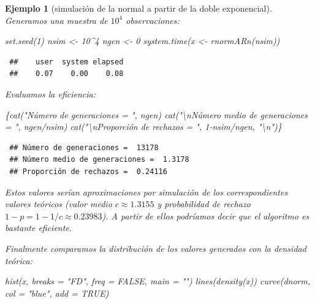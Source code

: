 \documentclass[
  10pt,
]{book}
\newenvironment{Shaded}{\begin{snugshade}}{\end{snugshade}}
\newcommand{\AttributeTok}[1]{\textcolor[rgb]{0.77,0.63,0.00}{#1}}
\newcommand{\ConstantTok}[1]{\textcolor[rgb]{0.00,0.00,0.00}{#1}}
\newcommand{\DecValTok}[1]{\textcolor[rgb]{0.00,0.00,0.81}{#1}}
\newcommand{\FunctionTok}[1]{\textcolor[rgb]{0.00,0.00,0.00}{#1}}
\newcommand{\NormalTok}[1]{#1}
\newcommand{\OtherTok}[1]{\textcolor[rgb]{0.56,0.35,0.01}{#1}}
\newcommand{\SpecialCharTok}[1]{\textcolor[rgb]{0.00,0.00,0.00}{#1}}
\newcommand{\StringTok}[1]{\textcolor[rgb]{0.31,0.60,0.02}{#1}}
\theoremstyle{break}
\newtheorem{example}{Ejemplo}[chapter]
\theoremstyle{nonumberplain}
\begin{document}
\begin{example}[simulación de la normal a partir de la doble exponencial]
Generamos una muestra de \(10^4\) observaciones:

\begin{Shaded}
\begin{Highlighting}[]
\FunctionTok{set.seed}\NormalTok{(}\DecValTok{1}\NormalTok{)}
\NormalTok{nsim }\OtherTok{\textless{}{-}} \DecValTok{10}\SpecialCharTok{\^{}}\DecValTok{4}
\NormalTok{ngen }\OtherTok{\textless{}{-}} \DecValTok{0}
\FunctionTok{system.time}\NormalTok{(x }\OtherTok{\textless{}{-}} \FunctionTok{rnormARn}\NormalTok{(nsim))}
\end{Highlighting}
\end{Shaded}

\begin{verbatim}
 ##    user  system elapsed 
 ##    0.07    0.00    0.08
\end{verbatim}

Evaluamos la eficiencia:

\begin{Shaded}
\begin{Highlighting}[]
\NormalTok{\{}\FunctionTok{cat}\NormalTok{(}\StringTok{"Número de generaciones = "}\NormalTok{, ngen)}
\FunctionTok{cat}\NormalTok{(}\StringTok{"}\SpecialCharTok{\textbackslash{}n}\StringTok{Número medio de generaciones = "}\NormalTok{, ngen}\SpecialCharTok{/}\NormalTok{nsim)}
\FunctionTok{cat}\NormalTok{(}\StringTok{"}\SpecialCharTok{\textbackslash{}n}\StringTok{Proporción de rechazos = "}\NormalTok{, }\DecValTok{1}\SpecialCharTok{{-}}\NormalTok{nsim}\SpecialCharTok{/}\NormalTok{ngen, }\StringTok{"}\SpecialCharTok{\textbackslash{}n}\StringTok{"}\NormalTok{)\}}
\end{Highlighting}
\end{Shaded}

\begin{verbatim}
 ## Número de generaciones =  13178
 ## Número medio de generaciones =  1.3178
 ## Proporción de rechazos =  0.24116
\end{verbatim}

Estos valores serían aproximaciones por simulación de los correspondientes valores teóricos (valor medio \(c \approx 1.3155\) y probabilidad de rechazo \(1 - p = 1 - 1/c \approx 0.23983\)).
A partir de ellos podríamos decir que el algoritmo es bastante eficiente.

Finalmente comparamos la distribución de los valores generados con la densidad teórica:

\begin{Shaded}
\begin{Highlighting}[]
\FunctionTok{hist}\NormalTok{(x, }\AttributeTok{breaks =} \StringTok{"FD"}\NormalTok{, }\AttributeTok{freq =} \ConstantTok{FALSE}\NormalTok{, }\AttributeTok{main =} \StringTok{""}\NormalTok{)}
\FunctionTok{lines}\NormalTok{(}\FunctionTok{density}\NormalTok{(x))}
\FunctionTok{curve}\NormalTok{(dnorm, }\AttributeTok{col =} \StringTok{"blue"}\NormalTok{, }\AttributeTok{add =} \ConstantTok{TRUE}\NormalTok{)}
\end{Highlighting}
\end{Shaded}


\end{example}
\end{document}
